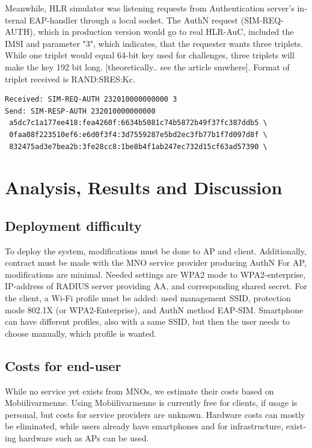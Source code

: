 \documentclass[12pt,a4paper,english]{tutthesis}
\begin{document}
\begin{otherlanguage}{english}
Meanwhile, HLR simulator was listening requests from Authentication
server's internal EAP-handler through a local socket.
The AuthN request (SIM-REQ-AUTH), which in production version would go
to real HLR-AuC, included the IMSI and parameter
"3", which indicates, that the requester wants three triplets. 
While one triplet would equal 64-bit key used for challenges, three
triplets will make the key 192 bit long. [theoretically.. see the
article smwhere].  Format of triplet received is RAND:SRES:Kc.

\scriptsize
\begin{verbatim}
Received: SIM-REQ-AUTH 232010000000000 3
Send: SIM-RESP-AUTH 232010000000000 
 a5dc7c1a177ee418:fea4260f:6634b5081c74b5872b49f37fc387ddb5 \
 0faa08f223510ef6:e6d0f3f4:3d7559287e5bd2ec3fb77b1f7d097d8f \
 832475ad3e7bea2b:3fe28cc8:1be8b4f1ab247ec732d15cf63ad57390 \
\end{verbatim}
\normalsize


\chapter{Analysis, Results and Discussion}
\label{sec-6}



\section{Deployment difficulty}
\label{sec-6-1}

To deploy the system, modifications must be done to AP and client.
Additionally, contract must be made with the MNO service
provider producing AuthN 
For AP, modifications are minimal. Needed settings are
WPA2 mode to WPA2-enterprise, IP-address of RADIUS server providing 
AA, and corresponding shared secret.
For  the client, a Wi-Fi profile must be added: used management SSID,
protection mode 802.1X (or WPA2-Enterprise), and AuthN method EAP-SIM.
Smartphone can have different profiles, also with a same SSID, but
then the user needs to choose manually, which profile is wanted.

\section{Costs for end-user}
\label{sec-6-2}
While no service yet exists from MNOs, we estimate their costs based
on Mobiilivarmenne. Using Mobiilivarmenne is currently free for
clients, if usage is personal, but costs for service providers are
unknown.  Hardware costs can mostly be eliminated, while users already
have smartphones and for infrastructure, existing hardware such as APs
can be used.


\end{otherlanguage}
\end{document}
